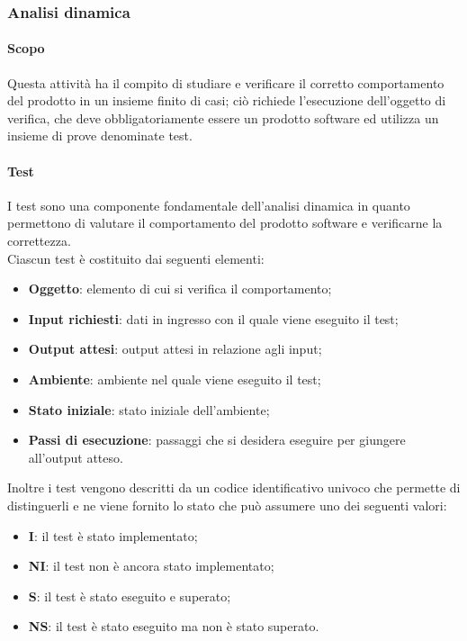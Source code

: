 \subsubsection{Analisi dinamica}
\label{ssub:verifica:analisi_dinamica}

\paragraph{Scopo}

Questa attività ha il compito di studiare e verificare il corretto comportamento del prodotto in un insieme finito di casi; ciò richiede
l'esecuzione dell'oggetto di verifica, che deve obbligatoriamente essere un prodotto software ed utilizza un insieme di prove denominate
test.

\paragraph{Test}
\label{par:verifica:test}

I test sono una componente fondamentale dell'analisi dinamica in quanto permettono di valutare il comportamento del prodotto software e
verificarne la correttezza.\\
Ciascun test è costituito dai seguenti elementi:
\begin{itemize}
    \item \textbf{Oggetto}: elemento di cui si verifica il comportamento;
    \item \textbf{Input richiesti}: dati in ingresso con il quale viene eseguito il test;
    \item \textbf{Output attesi}: output attesi in relazione agli input;
    \item \textbf{Ambiente}: ambiente nel quale viene eseguito il test;
    \item \textbf{Stato iniziale}: stato iniziale dell'ambiente;
    \item \textbf{Passi di esecuzione}: passaggi che si desidera eseguire per giungere all'output atteso.
\end{itemize}

Inoltre i test vengono descritti da un codice identificativo univoco che permette di distinguerli e ne viene fornito lo stato che può
assumere uno dei seguenti valori:
\begin{itemize}
    \item \textbf{I}: il test è stato implementato;
    \item \textbf{NI}: il test non è ancora stato implementato;
    \item \textbf{S}: il test è stato eseguito e superato;
    \item \textbf{NS}: il test è stato eseguito ma non è stato superato.
\end{itemize}

